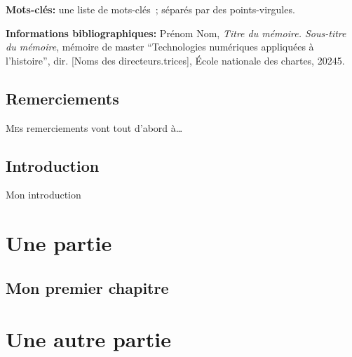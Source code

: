 \documentclass[12pt,twoside]{book}
\begin{document}
	\textbf{Mots-clés:} une liste de mots-clés~; séparés par des points-virgules.
	
	\textbf{Informations bibliographiques:} Prénom Nom, \textit{Titre du mémoire. Sous-titre du mémoire}, mémoire de master \enquote{Technologies numériques appliquées à l'histoire}, dir. [Noms des directeurs.trices], École nationale des chartes, 20245.
	
		\newpage{\pagestyle{empty}\cleardoublepage}
	
	\chapter{Remerciements}
	
\lettrine{M}es remerciements vont tout d'abord à\dots
	\newpage{\pagestyle{empty}\cleardoublepage}
	

	
\chapter{Introduction}	
Mon introduction 

\newpage{\pagestyle{empty}\cleardoublepage}

	\mainmatter

	

	\part{Une partie}
\chapter{Mon premier chapitre}


%
%	
	
	\part{Une autre partie}
	
\end{document}
